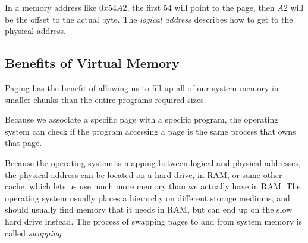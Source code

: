 In a memory address like \(0x54A2\), the first \(54\) will point to the page, then \(A2\) will be the offset to the actual byte.
The \emph{logical address} describes how to get to the physical address.

\subsection{Benefits of Virtual Memory}\label{sub:benefits_of_virtual_memory}

Paging has the benefit of allowing us to fill up all of our system memory in smaller chunks than the entire programs required sizes.

Because we associate a specific page with a specific program, the operating system can check if the program accessing a page is the same process that owns that page.

Because the operating system is mapping between logical and physical addresses, the physical address can be located on a hard drive, in RAM, or some other cache, which lets us use much more memory than we actually have in RAM.
The operating system usually places a hierarchy on different storage mediums, and should usually find memory that it needs in RAM, but can end up on the slow hard drive instead.
The process of swapping pages to and from system memory is called \emph{swapping}.

